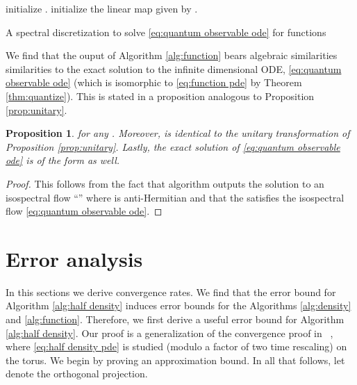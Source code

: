 \documentclass[final,leqno]{amsart}
\newtheorem{proposition}[theorem]{Proposition}
\begin{document}
\begin{algorithm}[H]
	initialize .\;
	initialize the linear map 
	given by .\;
	\For{  }{
		 \;
		 \;
	}
	\;	
	\caption{A spectral discretization to solve \eqref{eq:quantum observable ode} for functions} \label{alg:function}
\end{algorithm}

We find that the ouput of Algorithm \ref{alg:function} bears algebraic similarities similarities to the exact solution to the infinite dimensional ODE, \eqref{eq:quantum observable ode} (which is isomorphic to \eqref{eq:function pde} by Theorem \ref{thm:quantize}).
This is stated in a proposition analogous to Proposition \ref{prop:unitary}.

\begin{proposition} \label{prop:isospectral}
 for any .
Moreover,  is identical to the unitary transformation of Proposition \ref{prop:unitary}.
Lastly, the exact solution of \eqref{eq:quantum observable ode} is of the form  as well.
\end{proposition}
\begin{proof}
	This follows from the fact that algorithm outputs the solution to an isospectral flow ``''
	where  is anti-Hermitian and that the  satisfies the isospectral flow \eqref{eq:quantum observable ode}.
\end{proof}

\section{Error analysis} \label{sec:analysis}

In this sections we derive convergence rates.
We find that the error bound for Algorithm \ref{alg:half density} induces error bounds for the Algorithms \ref{alg:density} and \ref{alg:function}.
Therefore, we first derive a useful error bound for Algorithm \ref{alg:half density}.
Our proof is a generalization of the convergence proof in ~\cite{Pasciak1980}, where \eqref{eq:half density pde} is studied (modulo a factor of two time rescaling) on the torus.
We begin by proving an approximation bound.
In all that follows, let  denote the orthogonal projection.
\end{document}
